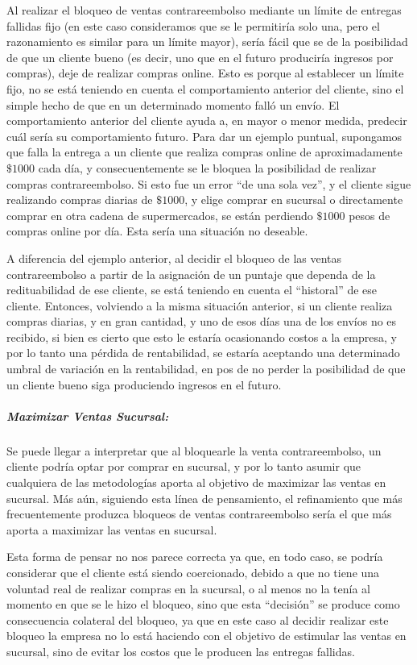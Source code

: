 Al realizar el bloqueo de ventas contrareembolso mediante un límite de
entregas fallidas fijo (en este caso consideramos que se le permitiría solo
una, pero el razonamiento es similar para un límite mayor), sería fácil que se
de la posibilidad de que un cliente bueno (es decir, uno que en el futuro
produciría ingresos por compras), deje de realizar compras online. Esto es
porque al establecer un límite fijo, no se está teniendo en cuenta el
comportamiento anterior del cliente, sino el simple hecho de que en un
determinado momento falló un envío. El comportamiento anterior del cliente
ayuda a, en mayor o menor medida, predecir cuál sería su comportamiento
futuro. Para dar un ejemplo puntual, supongamos que falla la entrega a un
cliente que realiza compras online de aproximadamente $\$1000$ cada día, y
consecuentemente se le bloquea la posibilidad de realizar compras
contrareembolso. Si esto fue un error ``de una sola vez'', y el cliente sigue
realizando compras diarias de $\$1000$, y elige comprar en sucursal o
directamente comprar en otra cadena de supermercados, se están perdiendo
$\$1000$ pesos de compras online por día. Esta sería una situación no
deseable.

A diferencia del ejemplo anterior, al decidir el bloqueo de las ventas
contrareembolso a partir de la asignación de un puntaje que dependa de la
redituabilidad de ese cliente, se está teniendo en cuenta el ``historal'' de
ese cliente. Entonces, volviendo a la misma situación anterior, si un cliente
realiza compras diarias, y en gran cantidad, y uno de esos días una de los
envíos no es recibido, si bien es cierto que esto le estaría ocasionando
costos a la empresa, y por lo tanto una pérdida de rentabilidad, se estaría
aceptando una determinado umbral de variación en la rentabilidad, en pos de no
perder la posibilidad de que un cliente bueno siga produciendo ingresos en el
futuro.

\subparagraph{Maximizar Ventas Sucursal:}

Se puede llegar a interpretar que al bloquearle la venta contrareembolso, un
cliente podría optar por comprar en sucursal, y por lo tanto asumir que
cualquiera de las metodologías aporta al objetivo de maximizar las ventas en
sucursal. Más aún, siguiendo esta línea de pensamiento, el refinamiento que
más frecuentemente produzca bloqueos de ventas contrareembolso sería el que
más aporta a maximizar las ventas en sucursal.

Esta forma de pensar no nos parece correcta ya que, en todo caso, se podría
considerar que el cliente está siendo coercionado, debido a que no tiene una
voluntad real de realizar compras en la sucursal, o al menos no la tenía al
momento en que se le hizo el bloqueo, sino que esta ``decisión'' se produce
como consecuencia colateral del bloqueo, ya que en este caso al decidir
realizar este bloqueo la empresa no lo está haciendo con el objetivo de
estimular las ventas en sucursal, sino de evitar los costos que le producen
las entregas fallidas.


